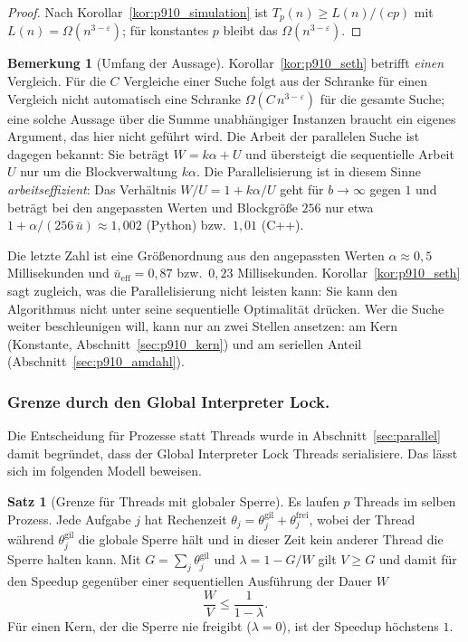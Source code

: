 \documentclass[a4paper,12pt, twoside]{report}
\theoremstyle{definition}
\newtheorem{satz}{Satz}
\newtheorem{bemerkung}{Bemerkung}
\begin{document}
\begin{proof}
Nach Korollar~\ref{kor:p910_simulation} ist $T_p(n)\ge L(n)/(cp)$ mit $L(n)=\Omega(n^{3-\varepsilon})$; für konstantes $p$ bleibt das $\Omega(n^{3-\varepsilon})$.
\end{proof}

\begin{bemerkung}[Umfang der Aussage]
\label{bem:p910_summe}
Korollar~\ref{kor:p910_seth} betrifft \emph{einen} Vergleich. Für die $C$ Vergleiche einer Suche folgt aus der Schranke für einen Vergleich nicht automatisch eine Schranke $\Omega(C\,n^{3-\varepsilon})$ für die gesamte Suche; eine solche Aussage über die Summe unabhängiger Instanzen braucht ein eigenes Argument, das hier nicht geführt wird. Die Arbeit der parallelen Suche ist dagegen bekannt: Sie beträgt $W=k\alpha+U$ und übersteigt die sequentielle Arbeit $U$ nur um die Blockverwaltung $k\alpha$. Die Parallelisierung ist in diesem Sinne \emph{arbeitseffizient}: Das Verhältnis $W/U=1+k\alpha/U$ geht für $b\to\infty$ gegen $1$ und beträgt bei den angepassten Werten und Blockgröße $256$ nur etwa $1+\alpha/(256\,\bar u)\approx 1{,}002$ (Python) bzw.\ $1{,}01$ (C++).
\end{bemerkung}

Die letzte Zahl ist eine Größenordnung aus den angepassten Werten $\alpha\approx 0{,}5$ Millisekunden und $\bar u_{\mathrm{eff}}=0{,}87$ bzw.\ $0{,}23$ Millisekunden. Korollar~\ref{kor:p910_seth} sagt zugleich, was die Parallelisierung nicht leisten kann: Sie kann den Algorithmus nicht unter seine sequentielle Optimalität drücken. Wer die Suche weiter beschleunigen will, kann nur an zwei Stellen ansetzen: am Kern (Konstante, Abschnitt~\ref{sec:p910_kern}) und am seriellen Anteil (Abschnitt~\ref{sec:p910_amdahl}).

\subsubsection{Grenze durch den Global Interpreter Lock.}
Die Entscheidung für Prozesse statt Threads wurde in Abschnitt~\ref{sec:parallel} damit begründet, dass der Global Interpreter Lock Threads serialisiere. Das lässt sich im folgenden Modell beweisen.

\begin{satz}[Grenze für Threads mit globaler Sperre]
\label{satz:p910_gil}
Es laufen $p$ Threads im selben Prozess. Jede Aufgabe $j$ hat Rechenzeit $\theta_j=\theta_j^{\mathrm{gil}}+\theta_j^{\mathrm{frei}}$, wobei der Thread während $\theta_j^{\mathrm{gil}}$ die globale Sperre hält und in dieser Zeit kein anderer Thread die Sperre halten kann. Mit $G=\sum_j\theta_j^{\mathrm{gil}}$ und $\lambda=1-G/W$ gilt $V\ge G$ und damit für den Speedup gegenüber einer sequentiellen Ausführung der Dauer $W$
\[
\frac WV\le\frac1{1-\lambda}.
\]
Für einen Kern, der die Sperre nie freigibt ($\lambda=0$), ist der Speedup höchstens $1$.
\end{satz}
\end{document}
